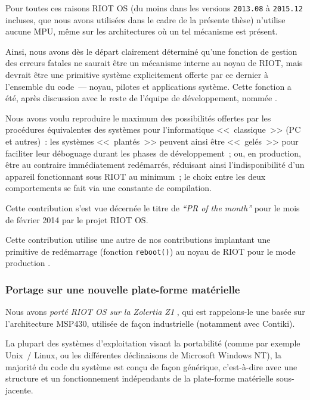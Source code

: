 Pour toutes ces raisons RIOT OS (du moins dans les versions \texttt{2013.08}
à \texttt{2015.12} incluses, que nous avons utilisées dans le cadre de
la présente thèse) n'utilise aucune MPU, même sur les architectures
où un tel mécanisme est présent.

\smallskip

Ainsi, nous avons dès le départ clairement déterminé qu'une fonction
de gestion des erreurs fatales ne saurait être un mécanisme interne
au noyau de RIOT, mais devrait être une primitive système explicitement
offerte par ce dernier à l'ensemble du code~--- noyau, pilotes et
applications système. Cette fonction a été, après discussion avec le
reste de l'équipe de développement, nommée .

Nous avons voulu reproduire le maximum des possibilités offertes
par les procédures équivalentes des systèmes pour l'informatique
<<~classique~>> (PC et autres)~: les systèmes <<~plantés~>> peuvent
ainsi être <<~gelés~>> pour faciliter leur déboguage durant les phases de
développement~; ou, en production, être au contraire immédiatement
redémarrés, réduisant ainsi l'indisponibilité d'un appareil fonctionnant
sous RIOT au minimum~; le choix entre les deux comportements se fait
via une constante de compilation.

Cette contribution s'est vue décernée le titre de \emph{``PR of the
month''} pour le mois de février 2014 par le projet RIOT OS.

Cette contribution utilise une autre de nos contributions implantant
une primitive de redémarrage (fonction \texttt{reboot()}) au noyau de RIOT
pour le mode production \cite{PRriotEnh5} \cite{PRriotEnh3}.

\subsubsection{Portage sur une nouvelle plate-forme matérielle}
\label{ParRIOTZolertiaZ1}

Nous avons \emph{porté RIOT OS sur la Zolertia Z1} \cite{PRriotPortZ1},
qui est rappelons-le une  basée sur l'architecture MSP430,
utilisée de façon industrielle (notamment avec Contiki).

\smallskip

La plupart des systèmes d'exploitation visant la portabilité (comme
par exemple Unix~/ Linux, ou les différentes déclinaisons de Microsoft
Windows NT), la majorité du code du système est conçu de façon générique,
c'est-à-dire avec une structure et un fonctionnement indépendants de la
plate-forme matérielle sous-jacente.

